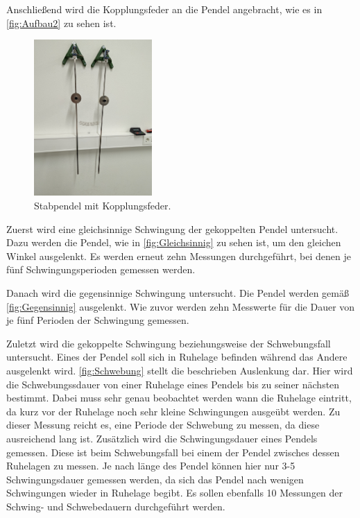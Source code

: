 Anschließend wird die Kopplungsfeder an die Pendel angebracht, wie es in \autoref{fig:Aufbau2} zu sehen ist. 
\begin{figure}
    \centering
    \includegraphics[width=0.4\textwidth]{content/Gekoppelt.jpg}
	\caption{Stabpendel mit Kopplungsfeder.}
	\label{fig:Aufbau2}
\end{figure}
Zuerst wird eine gleichsinnige Schwingung der gekoppelten Pendel untersucht. Dazu werden die Pendel, wie in \autoref{fig:Gleichsinnig} zu sehen ist, um den gleichen Winkel ausgelenkt.
Es werden erneut zehn Messungen durchgeführt, bei denen je fünf Schwingungsperioden gemessen werden.

Danach wird die gegensinnige Schwingung untersucht. Die Pendel werden gemäß \autoref{fig:Gegensinnig} ausgelenkt. Wie zuvor werden zehn Messwerte für die Dauer von je fünf Perioden der
Schwingung gemessen.


Zuletzt wird die gekoppelte Schwingung beziehungsweise der Schwebungsfall untersucht. Eines der Pendel soll sich in Ruhelage befinden während das Andere ausgelenkt wird. 
\autoref{fig:Schwebung} stellt die beschrieben Auslenkung dar. Hier wird die Schwebungssdauer von einer Ruhelage eines Pendels bis zu seiner nächsten bestimmt. Dabei muss sehr
genau beobachtet werden wann die Ruhelage eintritt, da kurz vor der Ruhelage noch sehr kleine Schwingungen ausgeübt werden. Zu dieser Messung reicht es, eine Periode der Schwebung
zu messen, da diese ausreichend lang ist. Zusätzlich wird die Schwingungsdauer eines Pendels gemessen. Diese ist beim Schwebungsfall bei einem der Pendel zwisches dessen Ruhelagen zu messen. Je nach länge 
des Pendel können hier nur 3-5 Schwingungsdauer gemessen werden, da sich das Pendel nach wenigen Schwingungen wieder in Ruhelage begibt. Es sollen ebenfalls 10 Messungen der Schwing- und Schwebedauern
durchgeführt werden. 